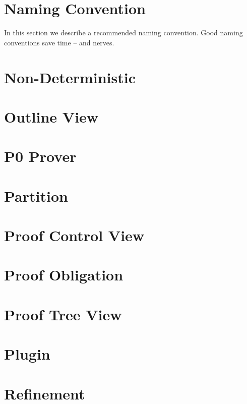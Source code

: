 \section{Naming Convention}
\label{naming_convention}

In this section we describe a recommended naming convention.  Good naming conventions save time -- and nerves.

\section{Non-Deterministic}
\label{non_deterministic}

\section{Outline View}
\label{outline_view}

\section{P0 Prover}
\label{p0_prover}

\section{Partition}
\label{partition}

\section{Proof Control View}
\label{proof_control_view}

\section{Proof Obligation}
\label{proof_obligation}

\section{Proof Tree View}
\label{proof_tree_view}

\section{Plugin}
\label{plugin}

\section{Refinement}
\label{refinement}

